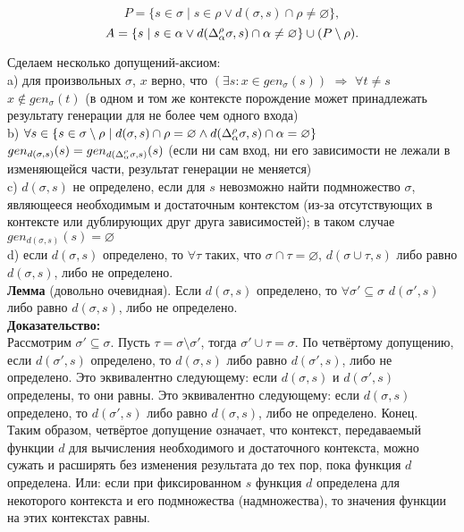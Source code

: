 





$$P = \{s \in \sigma \mid s \in \rho \vee d(\sigma, s) \cap \rho \neq \varnothing \},$$
$$A = \{s \mid s \in \alpha \vee d(\Delta_\alpha^\rho\sigma, s) \cap \alpha \neq \varnothing \} \cup (P \setminus \rho).$$

Сделаем несколько допущений-аксиом:\\
\indent a) для произвольных $\sigma$, $x$ верно, что $(\exists s: x \in gen_\sigma(s))$ $\Rightarrow$ $\forall t \neq s$ $x \notin gen_\sigma(t)$ (в одном и том же контексте порождение может принадлежать результату генерации для не более чем одного входа)\\
\indent b) $\forall s \in \{s \in \sigma \setminus \rho \mid d(\sigma, s) \cap \rho = \varnothing \wedge d(\Delta_\alpha^\rho\sigma, s) \cap \alpha = \varnothing \}$ $gen_{d(\sigma, s)} (s) = gen_{d(\Delta_\alpha^\rho\sigma, s)} (s)$ (если ни сам вход, ни его зависимости не лежали в изменяющейся части, результат генерации не меняется)\\
\indent c) $d(\sigma, s)$ не определено, если для $s$ невозможно найти подмножество $\sigma$, являющееся необходимым и достаточным контекстом (из-за отсутствующих в контексте или дублирующих друг друга зависимостей); в таком случае $gen_{d(\sigma, s)}(s) = \varnothing$\\
\indent d) если $d(\sigma, s)$ определено, то $\forall \tau$ таких, что $\sigma \cap \tau = \varnothing$, $d(\sigma \cup \tau, s)$ либо равно $d(\sigma, s)$, либо не определено.\\

\textbf{Лемма} (довольно очевидная). Если $d(\sigma, s)$ определено, то $\forall \sigma' \subseteq \sigma$ $d(\sigma', s)$ либо равно $d(\sigma, s)$, либо не определено.\\
\textbf{Доказательство:}\\
Рассмотрим $\sigma' \subseteq \sigma$. Пусть $\tau = \sigma \setminus \sigma'$, тогда $\sigma' \cup \tau = \sigma$. По четвёртому допущению, если $d(\sigma', s)$ определено, то $d(\sigma, s)$ либо равно $d(\sigma', s)$, либо не определено. Это эквивалентно следующему: если $d(\sigma, s)$ и $d(\sigma', s)$ определены, то они равны. Это эквивалентно следующему: если $d(\sigma, s)$ определено, то $d(\sigma', s)$ либо равно $d(\sigma, s)$, либо не определено. Конец.\\

Таким образом, четвёртое допущение означает, что контекст, передаваемый функции $d$ для вычисления необходимого и достаточного контекста, можно сужать и расширять без изменения результата до тех пор, пока функция $d$ определена. Или: если при фиксированном $s$ функция $d$ определена для некоторого контекста и его подмножества (надмножества), то значения функции на этих контекстах равны.

